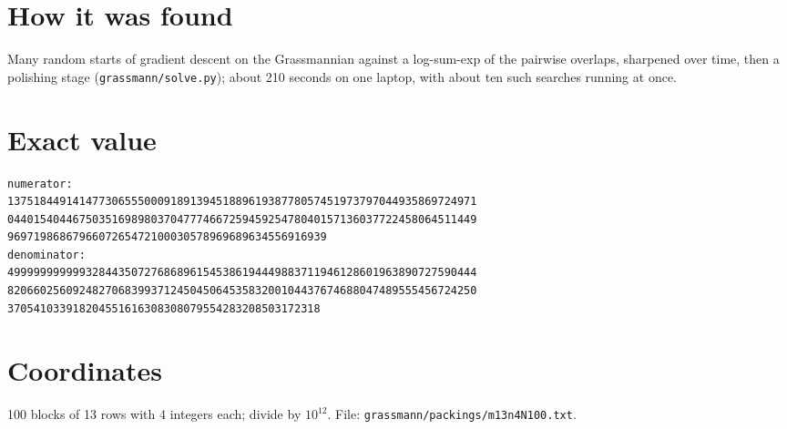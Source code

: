 \documentclass[11pt,a4paper]{article}
\begin{document}
\section{How it was found}
Many random starts of gradient descent on the Grassmannian against a log-sum-exp of the pairwise overlaps, sharpened over time, then a polishing stage (\texttt{grassmann/solve.py}); about 210 seconds on one laptop, with about ten such searches running at once.


\appendix
\section{Exact value}
{\small
\begin{verbatim}
numerator:
137518449141477306555000918913945188961938778057451973797044935869724971
044015404467503516989803704777466725945925478040157136037722458064511449
9697198686796607265472100030578969689634556916939
denominator:
499999999999328443507276868961545386194449883711946128601963890727590444
820660256092482706839937124504506453583200104437674688047489555456724250
370541033918204551616308308079554283208503172318
\end{verbatim}}

\section{Coordinates}
100 blocks of 13 rows with 4 integers each; divide by $10^{12}$. File: \texttt{grassmann/packings/m13n4N100.txt}.
{\tiny
\begin{multicols}{3}
\end{multicols}}
\end{document}

